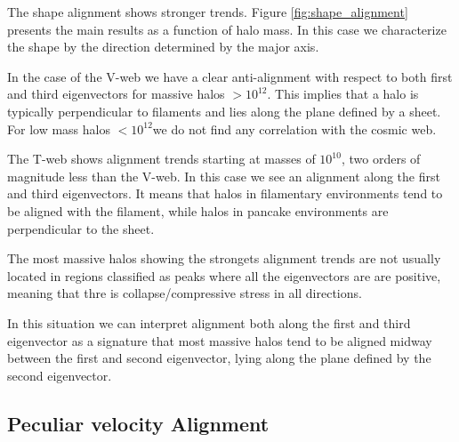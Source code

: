 \documentclass[usenatbib]{mn2e}
\newcommand{\hMsun}{{\ifmmode{h^{-1}{\rm
        {M_{\odot}}}}\else{$h^{-1}{\rm{M_{\odot}}}$}\fi}}
\begin{document}
The shape alignment shows stronger trends. Figure
\ref{fig:shape_alignment} presents the main results as a function of
halo mass. In this case we characterize the shape by the direction
determined by the major axis.

In the case of the V-web we have a clear anti-alignment with respect
to both first and third eigenvectors for massive halos
$>10^{12}$\hMsun. This implies that a halo is typically perpendicular to 
filaments and lies along the plane defined by a sheet. For low mass
halos $<10^{12}$\hMsun we do not find any correlation with the
cosmic web.

The T-web shows alignment  trends starting at masses of
$10^{10}$\hMsun, two orders of magnitude less than the V-web. In this
case we see an alignment along the first and third eigenvectors. It
means that halos in filamentary environments tend to be aligned with
the filament, while halos in pancake environments are perpendicular to
the sheet. 

The most massive halos showing the strongets alignment trends are not
usually located in regions classified as peaks where all the
eigenvectors are are positive, meaning that thre is
collapse/compressive stress in all directions. 

In this situation we
can interpret alignment both along the first and third eigenvector as
a signature that most massive halos tend to be aligned midway between
the first and second eigenvector, lying along the plane defined by the
second eigenvector.







\subsection{Peculiar velocity Alignment}
\end{document}
